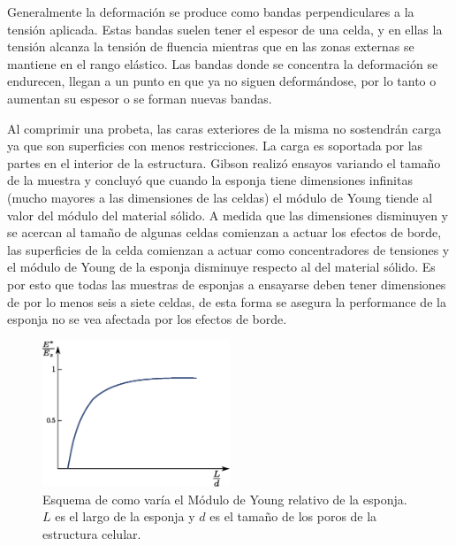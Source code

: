 \documentclass[a4paper,12pt,fleqn,twoside,openany]{book}
\begin{document}
Generalmente la deformación se produce como bandas perpendiculares a la tensión aplicada. Estas bandas suelen tener el espesor de una celda, 
y en ellas la tensión alcanza la tensión de fluencia mientras que en las zonas externas se mantiene en el rango elástico. Las bandas donde se 
concentra la deformación se endurecen, llegan a un punto en que ya no siguen deformándose, por lo tanto o aumentan su espesor o se forman nuevas bandas.

Al comprimir una probeta, las caras exteriores de la misma no sostendrán carga ya que son superficies con menos restricciones.
La carga es soportada por las partes en el interior de la estructura. Gibson \cite{gibson} realizó ensayos variando el tamaño de la muestra 
y concluyó que cuando la esponja tiene 
dimensiones infinitas (mucho mayores a las dimensiones de las celdas) el módulo de Young tiende al valor del módulo del material sólido. A medida que 
las dimensiones disminuyen y se acercan al tamaño de algunas celdas comienzan a actuar los efectos 
de borde, las superficies de la celda comienzan a actuar como concentradores de tensiones y el módulo de Young de la esponja disminuye respecto al del 
material sólido. Es por esto que todas las muestras de esponjas a ensayarse deben tener dimensiones de por lo menos seis a siete celdas, de esta 
forma se asegura la performance de la esponja no se vea afectada por los efectos de borde.


\begin{figure}[h]
 \centering
 \includegraphics[width=0.5\textwidth]{Etam.eps}
 \caption{Esquema de como varía el Módulo de Young relativo de la esponja. $L$ es el largo de la esponja y $d$ es el tamaño de los poros de 
 la estructura celular. }
\end{figure}
\end{document}
